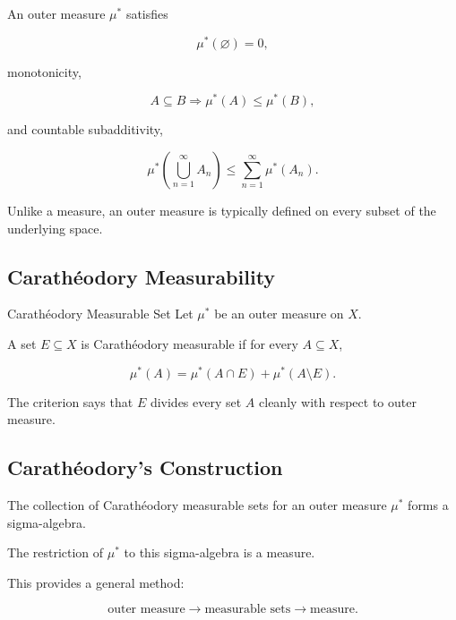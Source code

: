 An outer measure \(\mu^*\) satisfies

\[
\boxed{
\mu^*(\varnothing)=0,
}
\]

monotonicity,

\[
A\subseteq B
\Longrightarrow
\boxed{
\mu^*(A)\leq\mu^*(B),
}
\]

and countable subadditivity,

\[
\boxed{
\mu^*\left(
\bigcup_{n=1}^{\infty}A_n
\right)
\leq
\sum_{n=1}^{\infty}\mu^*(A_n).
}
\]

Unlike a measure, an outer measure is typically defined on every subset of
the underlying space.

\subsection{Carath\'eodory Measurability}
\label{subsec:caratheodory-measurability}

\begin{definitionbox}{Carath\'eodory Measurable Set}
Let \(\mu^*\) be an outer measure on \(X\).

A set \(E\subseteq X\) is Carath\'eodory measurable if for every
\(A\subseteq X\),

\[
\boxed{
\mu^*(A)
=
\mu^*(A\cap E)
+
\mu^*(A\setminus E).
}
\]
\end{definitionbox}

The criterion says that \(E\) divides every set \(A\) cleanly with respect
to outer measure.

\subsection{Carath\'eodory's Construction}
\label{subsec:caratheodory-construction}

\begin{theorem}
The collection of Carath\'eodory measurable sets for an outer measure
\(\mu^*\) forms a sigma-algebra.

The restriction of \(\mu^*\) to this sigma-algebra is a measure.
\end{theorem}

This provides a general method:

\[
\boxed{
\text{outer measure}
\longrightarrow
\text{measurable sets}
\longrightarrow
\text{measure}.
}
\]

